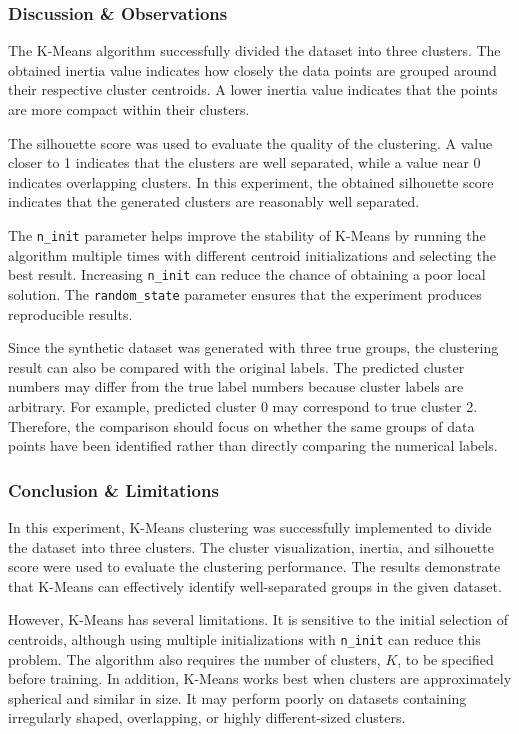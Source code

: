 \documentclass[a4paper,11pt]{article}
\begin{document}
\subsubsection{Discussion \& Observations}

The K-Means algorithm successfully divided the dataset into three clusters. The obtained inertia value indicates how closely the data points are grouped around their respective cluster centroids. A lower inertia value indicates that the points are more compact within their clusters.

The silhouette score was used to evaluate the quality of the clustering. A value closer to 1 indicates that the clusters are well separated, while a value near 0 indicates overlapping clusters. In this experiment, the obtained silhouette score indicates that the generated clusters are reasonably well separated.

The \texttt{n\_init} parameter helps improve the stability of K-Means by running the algorithm multiple times with different centroid initializations and selecting the best result. Increasing \texttt{n\_init} can reduce the chance of obtaining a poor local solution. The \texttt{random\_state} parameter ensures that the experiment produces reproducible results.

Since the synthetic dataset was generated with three true groups, the clustering result can also be compared with the original labels. The predicted cluster numbers may differ from the true label numbers because cluster labels are arbitrary. For example, predicted cluster 0 may correspond to true cluster 2. Therefore, the comparison should focus on whether the same groups of data points have been identified rather than directly comparing the numerical labels.

\subsubsection{Conclusion \& Limitations}

In this experiment, K-Means clustering was successfully implemented to divide the dataset into three clusters. The cluster visualization, inertia, and silhouette score were used to evaluate the clustering performance. The results demonstrate that K-Means can effectively identify well-separated groups in the given dataset.

However, K-Means has several limitations. It is sensitive to the initial selection of centroids, although using multiple initializations with \texttt{n\_init} can reduce this problem. The algorithm also requires the number of clusters, $K$, to be specified before training. In addition, K-Means works best when clusters are approximately spherical and similar in size. It may perform poorly on datasets containing irregularly shaped, overlapping, or highly different-sized clusters.
\end{document}
